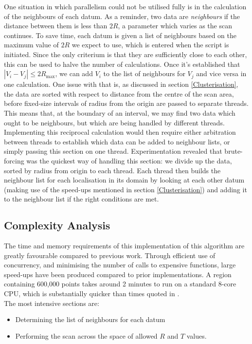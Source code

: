 \documentclass[11pt]{article}
\begin{document}
One situation in which parallelism could not be utilised fully is in the calculation of the neighbours of each datum. As a reminder, two data are \textit{neighbours} if the distance between them is less than $2R$, a parameter which varies as the scan continues. To save time, each datum is given a list of neighbours based on the maximum value of $2R$ we expect to use, which is entered when the script is initiated. Since the only criterium is that they are sufficiently close to each other, this can be used to halve the number of calculations. Once it's established that $|V_i - V_j| \leq 2R_\text{max}$, we can add $V_i$ to the list of neighbours for $V_j$ and vice versa in one calculation. One issue with that is, as discussed in section \ref{Clusterisation}, the data are sorted with respect to distance from the centre of the scan area, before fixed-size intervals of radius from the origin are passed to separate threads. This means that, at the boundary of an interval, we may find two data which ought to be neighbours, but which are being handled by different threads. Implementing this reciprocal calculation would then require either arbitration between threads to establish which data can be added to neighbour lists, or simply passing this section on one thread. Experimentation revealed that brute-forcing was the quickest way of handling this section: we divide up the data, sorted by radius from origin to each thread. Each thread then builds the neighbour list for each localisation in its domain by looking at each other datum (making use of the speed-ups mentioned in section \ref{Clusterisation}) and adding it to the neighbour list if the right conditions are met.

\subsection{Complexity Analysis}

The time and memory requirements of this implementation of this algorithm are greatly favourable compared to previous work. Through efficient use of concurrency, and minimising the number of calls to expensive functions, large speed-ups have been produced compared to prior implementations. A region containing 600,000 points takes around 2 minutes to run on a standard 8-core CPU, which is substantially quicker than times quoted in \cite{williamson2020machine}. \\

The most intensive sections are:
\begin{itemize}
	\item Determining the list of neighbours for each datum
	\item Performing the scan across the space of allowed $R$ and $T$ values.
\end{itemize}
\end{document}
